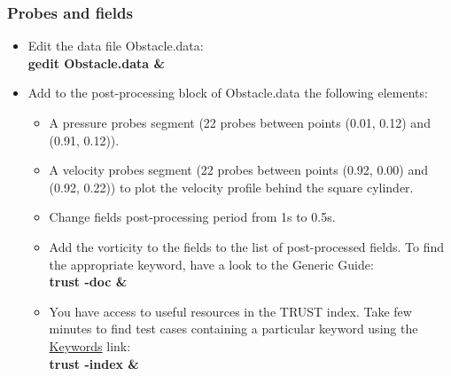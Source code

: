 \documentclass[10pt, hyperref={unicode=true,pdfusetitle, bookmarks=true,bookmarksnumbered=false,bookmarksopen=false, breaklinks=false,pdfborder={0 0l 1},backref=true,colorlinks=true,linkcolor=darkblue,pageanchor}]{beamer}
\begin{document}
\begin{frame}
\frametitle{Probes and fields}
\begin{block}{}

\begin{itemize}
\item Edit the data file Obstacle.data:\\
\textbf{gedit Obstacle.data \&}\\

\item Add to the post-processing block of Obstacle.data the following elements:\\

    \begin{itemize}
    \item [$\circ$] A pressure probes segment (22 probes between points (0.01, 0.12) and (0.91, 0.12)).
    \vspace{0.1cm}

    \item [$\circ$] A velocity probes segment (22 probes between points (0.92, 0.00) and (0.92, 0.22)) to plot the velocity profile behind the square cylinder.
    \vspace{0.1cm}

    \item [$\circ$] Change fields post-processing period from 1s to 0.5s.
    \vspace{0.1cm}
    
     \item [$\circ$] Add the vorticity to the fields to the list of post-processed fields. To find the appropriate keyword, have a look to the Generic Guide:\\
    \textbf{trust -doc \&}
    \vspace{0.1cm}
    \item [$\rightarrow$] You have access to useful resources in the TRUST index. Take few minutes to find test cases containing a particular keyword using the \underline{Keywords} link: \\
\textbf{trust -index \&}\\
\vspace{0.1cm}
    
    \end{itemize}

\end{itemize}

\end{block}
\end{frame}
\end{document}
